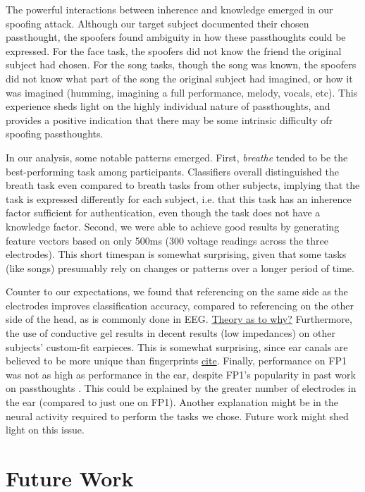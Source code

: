 \documentclass[letterpaper,twocolumn,10pt]{article}
\begin{document}
The powerful interactions between inherence and knowledge emerged in our spoofing attack. Although our target subject documented their chosen passthought, the spoofers found ambiguity in how these passthoughts could be expressed. For the face task, the spoofers did not know the friend the original subject had chosen. For the song tasks, though the song was known, the spoofers did not know what part of the song the original subject had imagined, or how it was imagined (humming, imagining a full performance, melody, vocals, etc). This experience sheds light on the highly individual nature of passthoughts, and provides a positive indication that there may be some intrinsic difficulty ofr spoofing passthoughts.

In our analysis, some notable patterns emerged. First, \textit{breathe} tended to be the best-performing task among participants. Classifiers overall distinguished the breath task even compared to breath tasks from other subjects, implying that the task is expressed differently for each subject, i.e. that this task has an inherence factor sufficient for authentication, even though the task does not have a knowledge factor. Second, we were able to achieve good results by generating feature vectors based on only 500ms (300 voltage readings across the three electrodes). This short timespan is somewhat surprising, given that some tasks (like songs) presumably rely on changes or patterns over a longer period of time. 

Counter to our expectations, we found that referencing on the same side as the electrodes improves classification accuracy, compared to referencing on the other side of the head, as is commonly done in EEG. \underline{Theory as to why?} Furthermore, the use of conductive gel results in decent results (low impedances) on other subjects' custom-fit earpieces. This is somewhat surprising, since ear canals are believed to be more unique than fingerprints \underline{cite}. Finally, performance on FP1 was not as high as performance in the ear, despite FP1's popularity in past work on passthoughts \cite{Chuang2013b}. This could be explained by the greater number of electrodes in the ear (compared to just one on FP1). Another explanation might be in the neural activity required to perform the tasks we chose. Future work might shed light on this issue.


\section{Future Work}
\end{document}
